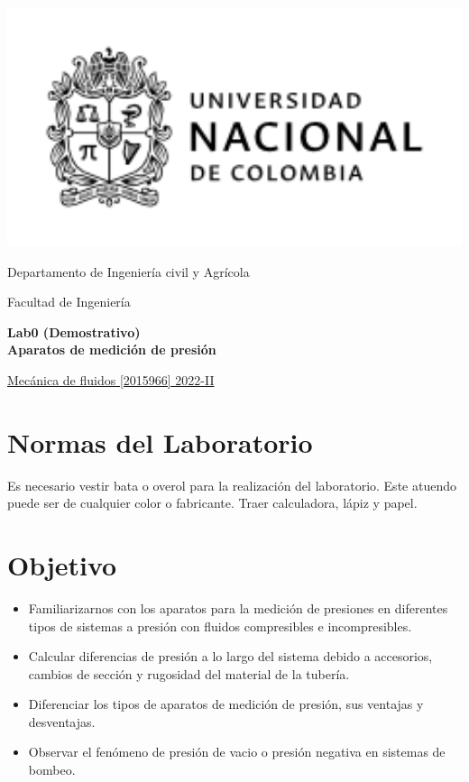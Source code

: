 \documentclass[12pt, a4paper]{exam}
\begin{document}
	\noindent
	\begin{minipage}[l]{0.1\textwidth}
		\noindent
		\includegraphics[width=2.8\textwidth]{ESCUDO.png}
	\end{minipage}
\hfill
\begin{minipage}[c]{0.8\textwidth}
	\begin{center}
		{\large  Departamento de Ingeniería civil y Agrícola\par
		\large	Facultad de Ingeniería	\par
    \large \textbf{Lab0 (Demostrativo) \\ Aparatos de medici\'on de presi\'on}	\par
} %
	\end{center}
\end{minipage}
\par
\vspace{0.2in}
\noindent
    \uline{Mecánica de fluidos [2015966]	\hfill 2022-II	}
\par 
\vspace{0.15in}
\noindent

\section{Normas del Laboratorio}
Es necesario vestir bata o overol para la realizaci\'on del laboratorio. Este atuendo puede ser de cualquier color o fabricante. Traer calculadora, l\'apiz y papel.

\section{Objetivo}
\begin{itemize}
\item Familiarizarnos con los aparatos para la medici\'on de presiones en diferentes tipos de sistemas a presi\'on con fluidos compresibles e incompresibles. 
\item Calcular diferencias de presi\'on a lo largo del sistema debido a accesorios, cambios de secci\'on y rugosidad del material de la tuber\'ia.
\item Diferenciar los tipos de aparatos de medici\'on de presi\'on, sus ventajas y desventajas.
\item Observar el fen\'omeno de presi\'on de vacio o presi\'on negativa en sistemas de bombeo. 
\end{itemize}
\end{document}
